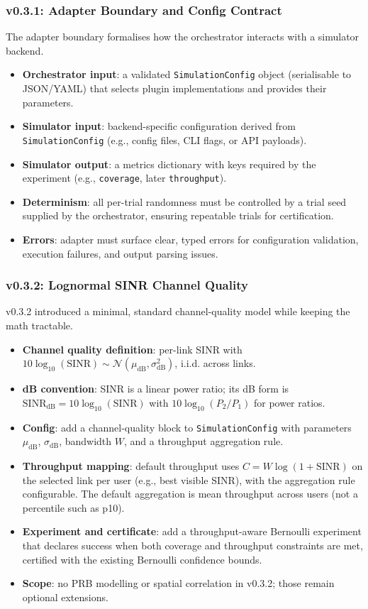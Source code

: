 \documentclass[11pt,a4paper]{article}
\begin{document}
\subsubsection{v0.3.1: Adapter Boundary and Config Contract}
The adapter boundary formalises how the orchestrator interacts with a simulator backend.
\begin{itemize}
    \item \textbf{Orchestrator input}: a validated \texttt{SimulationConfig} object (serialisable to JSON/YAML) that
    selects plugin implementations and provides their parameters.
    \item \textbf{Simulator input}: backend-specific configuration derived from \texttt{SimulationConfig}
    (e.g., config files, CLI flags, or API payloads).
    \item \textbf{Simulator output}: a metrics dictionary with keys required by the experiment (e.g., \texttt{coverage},
    later \texttt{throughput}).
    \item \textbf{Determinism}: all per-trial randomness must be controlled by a trial seed supplied by the orchestrator,
    ensuring repeatable trials for certification.
    \item \textbf{Errors}: adapter must surface clear, typed errors for configuration validation, execution failures, and
    output parsing issues.
\end{itemize}

\subsubsection{v0.3.2: Lognormal SINR Channel Quality}
v0.3.2 introduced a minimal, standard channel-quality model while keeping the math tractable.
\begin{itemize}
    \item \textbf{Channel quality definition}: per-link SINR with $10 \log_{10}(\mathrm{SINR})
    \sim \mathcal{N}(\mu_{\mathrm{dB}}, \sigma_{\mathrm{dB}}^2)$, i.i.d. across links.
    \item \textbf{dB convention}: SINR is a linear power ratio; its dB form is
    $\mathrm{SINR}_{\mathrm{dB}} = 10 \log_{10}(\mathrm{SINR})$ with $10 \log_{10}(P_2 / P_1)$ for power ratios.
    \item \textbf{Config}: add a channel-quality block to \texttt{SimulationConfig} with parameters
    $\mu_{\mathrm{dB}}$, $\sigma_{\mathrm{dB}}$, bandwidth $W$, and a throughput aggregation rule.
    \item \textbf{Throughput mapping}: default throughput uses $C = W \log(1 + \mathrm{SINR})$ on the
    selected link per user (e.g., best visible SINR), with the aggregation rule configurable.
    The default aggregation is mean throughput across users (not a percentile such as p10).
    \item \textbf{Experiment and certificate}: add a throughput-aware Bernoulli experiment that
    declares success when both coverage and throughput constraints are met, certified with the
    existing Bernoulli confidence bounds.
    \item \textbf{Scope}: no PRB modelling or spatial correlation in v0.3.2; those remain optional extensions.
\end{itemize}
\end{document}
